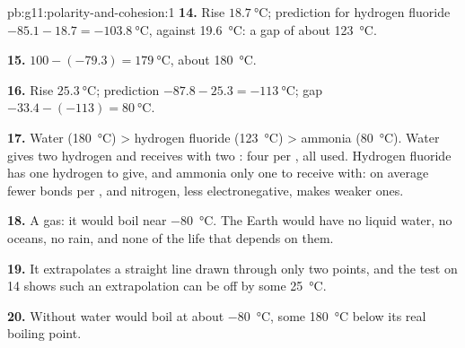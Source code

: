 \begin{solution}{pb:g11:polarity-and-cohesion:1}
\textbf{14.} Rise $\qty{18.7}{\celsius}$; prediction for hydrogen fluoride
$-85.1 - 18.7 = \qty{-103.8}{\celsius}$, against \qty{19.6}{\celsius}: a
gap of about \qty{123}{\celsius}.

\textbf{15.} $100 - (-79.3) = \qty{179}{\celsius}$, about
\qty{180}{\celsius}.

\textbf{16.} Rise $\qty{25.3}{\celsius}$; prediction $-87.8 - 25.3 =
\qty{-113}{\celsius}$; gap $-33.4 - (-113) = \qty{80}{\celsius}$.

\textbf{17.} Water (\qty{180}{\celsius}) > hydrogen fluoride
(\qty{123}{\celsius}) > ammonia (\qty{80}{\celsius}). Water gives two
hydrogen  and receives with two : four  per
, all used. Hydrogen fluoride has one hydrogen to give, and
ammonia only one  to receive with: on average fewer bonds per
, and nitrogen, less electronegative, makes weaker ones.

\textbf{18.} A gas: it would boil near \qty{-80}{\celsius}. The Earth
would have no liquid water, no oceans, no rain, and none of the life
that depends on them.

\textbf{19.} It extrapolates a straight line drawn through only two
points, and the test on  14 shows such an extrapolation can be off
by some \qty{25}{\celsius}.

\textbf{20.} Without  water would boil at about
\qty{-80}{\celsius}, some \qty{180}{\celsius} below its real boiling
point.
\end{solution}

